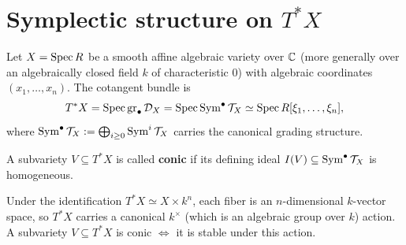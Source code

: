 \section{Symplectic structure on $T^\ast X$}\label{sec:symplectic-structure-on-T*X}

Let $X=\operatorname{Spec} R$ be a smooth affine algebraic variety over $\mathbb{C}$ (more generally
over an algebraically closed field $k$ of characteristic $0$) with algebraic
coordinates $(x_1,\dots,x_n)$.  The cotangent bundle is
\[
    T^\ast X = \operatorname{Spec} \operatorname{gr}_\bullet \mathcal{D}_X = \operatorname{Spec} \operatorname{Sym}^\bullet \mathcal{T}_X
    \simeq \operatorname{Spec} R[\xi_1,\dots,\xi_n],
\]
where $\operatorname{Sym}^\bullet \mathcal{T}_X:=\bigoplus_{i\ge0}\operatorname{Sym}^i \mathcal{T}_X$ carries the canonical
grading structure.

\begin{definition}
    A subvariety $V\subseteq T^\ast X$ is called \textbf{conic} if its defining ideal
    $I(V)\subseteq \operatorname{Sym}^\bullet \mathcal{T}_X$ is homogeneous.
\end{definition}

\begin{remark}\label{rmk:equivalent-definition-for-conic}
    Under the identification $T^\ast X\simeq X\times k^n$, each fiber is an
    $n$-dimensional $k$-vector space, so $T^\ast X$ carries a canonical $k^\times$ (which is an algebraic group over $k$)
    action.  A subvariety $V\subseteq T^\ast X$ is conic $\Leftrightarrow$ it is
    stable under this action.
\end{remark}

